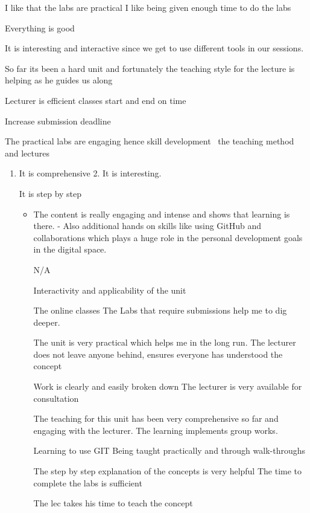 \documentclass[
]{article}
\providecommand{\tightlist}{%
  \setlength{\itemsep}{0pt}\setlength{\parskip}{0pt}}
\begin{document}
I like that the labs are practical I like being given enough time to do
the labs

Everything is good

It is interesting and interactive since we get to use different tools in
our sessions.

So far its been a hard unit and fortunately the teaching style for the
lecture is helping as he guides us along~

Lecturer is efficient classes start and end on time

Increase submission deadline~

The practical labs are engaging hence skill development~ the teaching
method and lectures~

\begin{enumerate}
\def\labelenumi{\arabic{enumi}.}
\tightlist
\item
  It is comprehensive 2. It is interesting.

  It is step by step ~

  \begin{itemize}
  \tightlist
  \item
    The content is really engaging and intense and shows that learning
    is there. - Also additional hands on skills like using GitHub and
    collaborations which plays a huge role in the personal development
    goals in the digital space.~

    N/A

    Interactivity and applicability of the unit

    The online classes The Labs that require submissions help me to dig
    deeper.

    The unit is very practical which helps me in the long run. The
    lecturer does not leave anyone behind, ensures everyone has
    understood the concept

    Work is clearly and easily broken down The lecturer is very
    available for consultation

    The teaching for this unit has been very comprehensive so far and
    engaging with the lecturer. The learning implements group works.

    Learning to use GIT Being taught practically and through
    walk-throughs

    The step by step explanation of the concepts is very helpful The
    time to complete the labs is sufficient~

    The lec takes his time to teach the concept


\end{itemize}
\end{enumerate}
\end{document}
